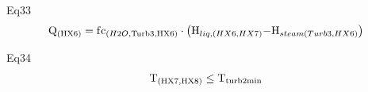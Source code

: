 \documentclass[10pt,a4paper]{article}
\begin{document}
Eq33
\begin{align}
	{{\rm{Q}}_{\left( {{\rm{HX6}}} \right)}} = {\rm{ f}}{{\rm{c}}_{\left( {H2O,{\rm{Turb3}},{\rm{HX6}}} \right)}}\cdot\left( {{{\rm{H}}_{liq,(HX6,HX7)}}{\rm{ - }}{{\rm{H}}_{steam(Turb3,HX6)}}} \right)
\end{align}

Eq34
\begin{align}
	{{\rm{T}}_{\left( {{\rm{HX7,HX8}}} \right)}}{\rm{ }} \le {\rm{ }}{{\rm{T}}_{{\rm{turb2min}}}}
\end{align}
\end{document}

